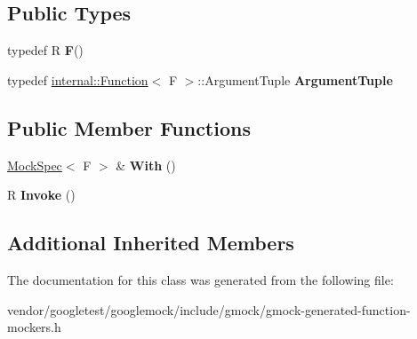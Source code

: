 \subsection*{Public Types}
\begin{DoxyCompactItemize}
\item 
\mbox{\label{classtesting_1_1internal_1_1_function_mocker_3_01_r_07_08_4_a2c1d7da413176d87405227df90a95521}} 
typedef R {\bfseries F}()
\item 
\mbox{\label{classtesting_1_1internal_1_1_function_mocker_3_01_r_07_08_4_a5a279e0d8414bf0809405c06a0725b66}} 
typedef \hyperlink{structtesting_1_1internal_1_1_function}{internal\+::\+Function}$<$ F $>$\+::Argument\+Tuple {\bfseries Argument\+Tuple}
\end{DoxyCompactItemize}
\subsection*{Public Member Functions}
\begin{DoxyCompactItemize}
\item 
\mbox{\label{classtesting_1_1internal_1_1_function_mocker_3_01_r_07_08_4_af5151d1ae246fab13ac6e890fa2599be}} 
\hyperlink{classtesting_1_1internal_1_1_mock_spec}{Mock\+Spec}$<$ F $>$ \& {\bfseries With} ()
\item 
\mbox{\label{classtesting_1_1internal_1_1_function_mocker_3_01_r_07_08_4_a8096a10aea2ffc6a78d0437855d2ef10}} 
R {\bfseries Invoke} ()
\end{DoxyCompactItemize}
\subsection*{Additional Inherited Members}


The documentation for this class was generated from the following file\+:\begin{DoxyCompactItemize}
\item 
vendor/googletest/googlemock/include/gmock/gmock-\/generated-\/function-\/mockers.\+h\end{DoxyCompactItemize}
